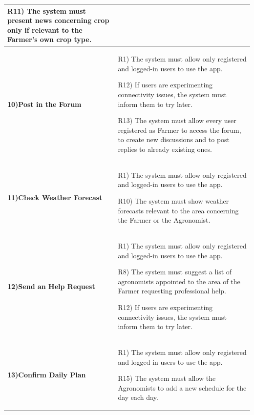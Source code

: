 \documentclass[table, 12pt]{article}
\begin{document}
\begin{itemize}
\begin{longtable}{|p{}|p{}|}
                                                                       R11) The system must present news concerning crop only if relevant to the Farmer's own crop type.\\\hline
                    \cellcolor{SpringGreen!50}\textbf{10)Post in the Forum}\centering &  R1) The system must allow only registered and logged-in users to use the app.
                    
                                                                               R12) If users are experimenting connectivity issues, the system must inform them to try later.
                                                                               
                                                                               R13) The system must allow every user registered as Farmer to access the forum, to create new discussions and to post replies to already existing ones.\\\hline
                    \cellcolor{SpringGreen!50}\textbf{11)Check Weather Forecast}\centering &  R1) The system must allow only registered and logged-in users to use the app.
                    
                                                                                    R10) The system must show weather forecasts relevant to the area concerning the Farmer or the Agronomist.\\\hline
                    \cellcolor{SpringGreen!50}\textbf{12)Send an Help Request}\centering &  R1) The system must allow only registered and logged-in users to use the app.
                    
                                                                                  R8) The system must suggest a list of agronomists appointed to the area of the Farmer requesting professional help.
                                                                                  
                                                                                  R12) If users are experimenting connectivity issues, the system must inform them to try later.\\\hline
                    \cellcolor{SpringGreen!50}\textbf{13)Confirm Daily Plan}\centering &  R1) The system must allow only registered and logged-in users to use the app.
                    
                                                                                          R15) The system must allow the Agronomists to add a new schedule for the day each day.
                                                                                        

\end{longtable}
\end{itemize}
\end{document}
